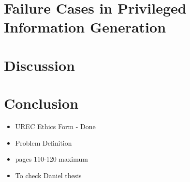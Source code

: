 
\section{Failure Cases in Privileged Information Generation}
\label{sec:5_fail_cases_priv_info_gen}


\section{Discussion}
\label{sec:5_discussion}

\section{Conclusion}
\label{sec:5_conclusion}




\begin{itemize}
    \item UREC Ethics Form - Done
    \item Problem Definition
    \item pages 110-120 maximum
    \item To check Daniel thesis
\end{itemize}

